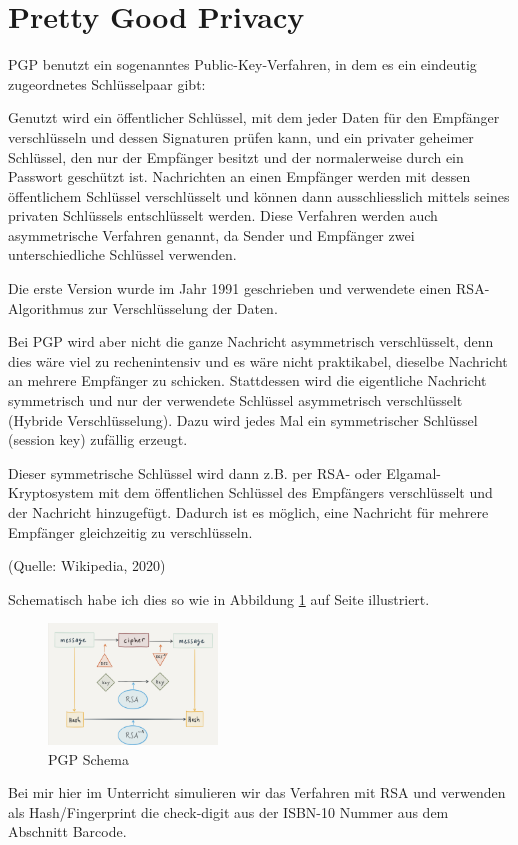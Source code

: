 \documentclass[%
11pt,%
twoside,%
titlepage,%
german,%
headsepline%
]{scrartcl}
\begin{document}
\clearpage

\section{Pretty Good Privacy}

PGP
benutzt ein sogenanntes Public-Key-Verfahren, in dem es ein eindeutig zugeordnetes Schlüsselpaar gibt:

Genutzt wird ein öffentlicher Schlüssel, mit dem jeder Daten für den Empfänger verschlüsseln und dessen Signaturen prüfen kann, und ein privater geheimer Schlüssel, den nur der Empfänger besitzt und der normalerweise durch ein Passwort geschützt ist. Nachrichten an einen Empfänger werden mit dessen öffentlichem Schlüssel verschlüsselt und können dann ausschliesslich mittels seines privaten Schlüssels entschlüsselt werden. Diese Verfahren werden auch asymmetrische Verfahren genannt, da Sender und Empfänger zwei unterschiedliche Schlüssel verwenden.

Die erste Version wurde im Jahr 1991 geschrieben und verwendete einen RSA-Al\-go\-rith\-mus zur Verschlüsselung der Daten.

Bei PGP wird aber nicht die ganze Nachricht asymmetrisch verschlüsselt, denn dies wäre viel zu rechenintensiv und es wäre nicht praktikabel, dieselbe Nachricht an mehrere Empfänger zu schicken. Stattdessen wird die eigentliche Nachricht symmetrisch und nur der verwendete Schlüssel asymmetrisch verschlüsselt (Hybride Verschlüsselung). Dazu wird jedes Mal ein symmetrischer Schlüssel (session key) zufällig erzeugt.

Dieser symmetrische Schlüssel wird dann z.B. per RSA- oder Elgamal-Kryptosystem mit dem öffentlichen Schlüssel des Empfängers verschlüsselt und der Nachricht hinzugefügt. Dadurch ist es möglich, eine Nachricht für mehrere Empfänger gleichzeitig zu verschlüsseln.

\hfill(Quelle: Wikipedia, 2020)

Schematisch
habe ich dies so wie in Abbildung \ref{fig:pgp} auf Seite \pageref{fig:pgp} illustriert.
\begin{figure}
    \centering
    \includegraphics[width=0.4\textwidth]{pictures/pgpscheme.jpeg}
    \caption{PGP Schema}
    \label{fig:pgp}
\end{figure}
Bei mir hier im Unterricht simulieren wir das Verfahren mit RSA und verwenden als Hash/Fingerprint die check-digit aus der ISBN-10 Nummer aus dem Abschnitt Barcode.
\end{document}

